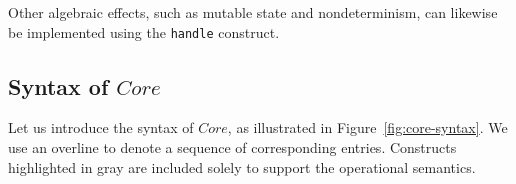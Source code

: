 \documentclass[acmsmall,review,screen]{acmart}
\newcommand{\ap}{~}
\newcommand{\keyword}[1]{\mathbf{#1}}
\begin{document}
Other algebraic effects, such as mutable state and nondeterminism, can likewise be implemented using the \texttt{handle} construct. %


\subsection{Syntax of $Core$} \label{subsec:syntax-core}

Let us introduce the syntax of $Core$, as illustrated in Figure~\ref{fig:core-syntax}.
We use an overline to denote a sequence of corresponding entries.
Constructs highlighted in gray are included solely to support the operational semantics.

\end{document}
